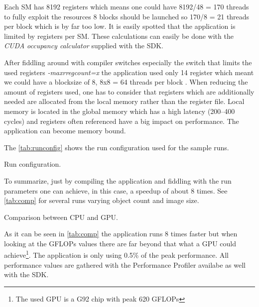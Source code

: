 Each \gls{SM} has 8192 registers which means one could have 8192/48 = 170 threads
to fully exploit the resources 8 blocks should be launched so 170/8 = 21 threads
per block which is by far too low. It is easily spotted that the application is
limited by registers per \gls{SM}. These calculations can easily be done with the
\emph{CUDA occupancy calculator} supplied with the SDK.

After fiddling around with compiler switches especially the switch that limits
the used registers \emph{-maxrregcount=x}
the application used only 14 register which meant we could have a blocksize of
8, 8x8 = 64 threads per block . When reducing the amount of registers used, one
has to consider that registers which are additionally needed are allocated from
the local memory rather than the register file. Local memory is located in the
global memory which has a high latency (200--400 cycles) and registers often
referenced have a big impact on performance. The application can become memory
bound.

The \autoref{tab:runconfig} shows the run configuration used for the sample runs. 

\begin{table}[ht]
	\centering
  	\caption[Run configuration]{Run configuration.}	
	\label{tab:runconfig}
\end{table}



To summarize, just by compiling the application and fiddling with the run
parameters one can achieve, in this case, a speedup of about 8 times. See
\autoref{tab:comp} for several runs varying object count and image size.

\begin{table}[ht]
	\centering
	\caption[Comparison between CPU and GPU]{Comparison between CPU and GPU.}
	\label{tab:comp}
\end{table}
	
	
As it can be seen in \autoref{tab:comp} the application runs 8 times faster but
when looking at the \glspl{GFLOP} values there are far beyond that what a
\gls{GPU} could achieve\footnote{The used \gls{GPU} is a G92 chip with peak 620
\glspl{GFLOP}}. The application is only using 0.5\% of the peak performance. All
performance values are gathered with the {} Performance
Profiler availabe as well with the \gls{SDK}.

